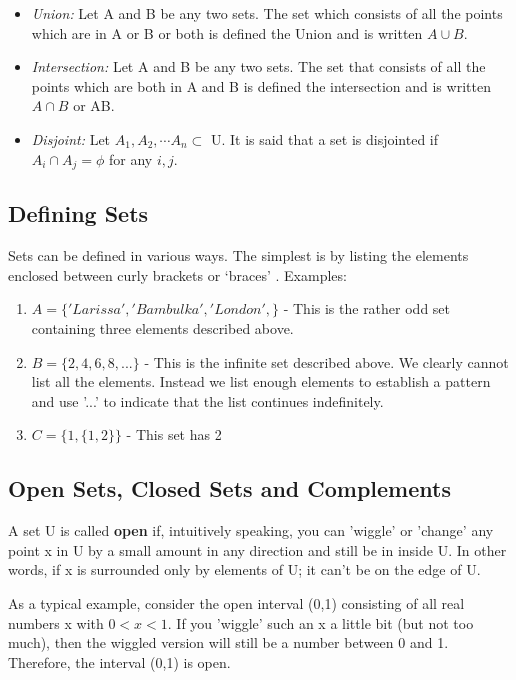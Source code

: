 \documentclass[12pt]{article}
\begin{document}
\begin{itemize}
	\item \textit{Union: }Let A and B be any two sets. The set which consists of all the points which are in A or B or both is defined the Union and is written $A \cup B$.
	\item \textit{Intersection: }Let A and B be any two sets. The set that consists of all the points which are both in A and B is defined the intersection and is written $A \cap B$ or AB.
	\item \textit{Disjoint: }Let $A_1,A_2, \cdots A_n \subset$ U. It is said that a set is disjointed if $A_i \cap A_j=\phi$ for any $i,j.$
\end{itemize}
\subsection{Defining Sets}

Sets can be defined in various ways. The simplest is by listing the elements enclosed between curly brackets or ‘braces’ { }. Examples:

\begin{enumerate}
	\item $A=\{'Larissa', 'Bambulka', 'London',\}$ - This is the rather odd set containing three elements described above.
	\item $B=\{2,4,6,8,...\}$ - This is the infinite set described above. We clearly cannot list all the elements. Instead we list enough elements to establish a pattern and use '...' to indicate that the list continues indefinitely.
	\item $C=\{1,\{1,2\}\}$ - This set has 2 
	
	
	
\end{enumerate}

\subsection{Open Sets, Closed Sets  and Complements}
A set U is called \textbf{open} if, intuitively speaking, you can 'wiggle' or 'change' any point x in U by a small amount in any direction and still be in inside U. In other words, if x is surrounded only by elements of U; it can't be on the edge of U.

As a typical example, consider the open interval (0,1) consisting of all real numbers x with $0<x<1$. If you 'wiggle' such an x a little bit (but not too much), then the wiggled version will still be a number between 0 and 1. Therefore, the interval (0,1) is open.
\end{document}
